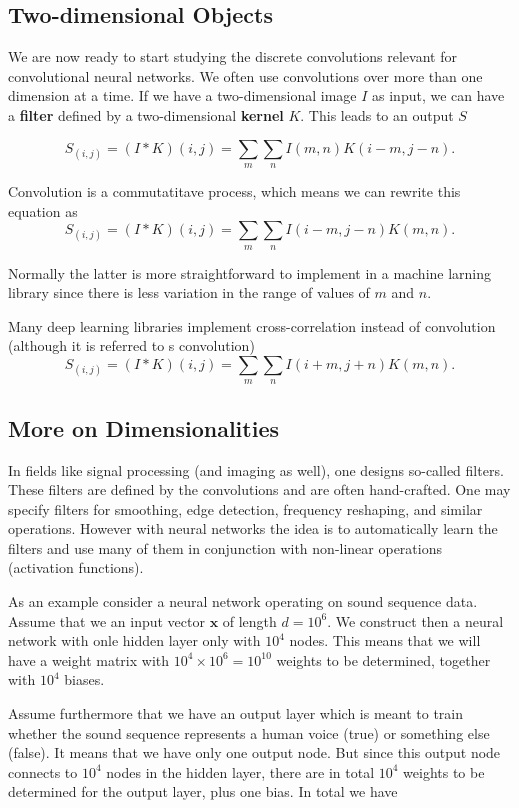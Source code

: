 \documentclass[%
oneside,                 %
final,                   %
10pt]{article}
\begin{document}
\subsection{Two-dimensional Objects}

We are now ready to start studying the discrete convolutions relevant for convolutional neural networks.
We often use convolutions over more than one dimension at a time. If
we have a two-dimensional image $I$ as input, we can have a \textbf{filter}
defined by a two-dimensional \textbf{kernel} $K$. This leads to an output $S$

\[
S_(i,j)=(I * K)(i,j) = \sum_m\sum_n I(m,n)K(i-m,j-n).
\]

Convolution is a commutatitave process, which means we can rewrite this equation as
\[
S_(i,j)=(I * K)(i,j) = \sum_m\sum_n I(i-m,j-n)K(m,n).
\]

Normally the latter is more straightforward to implement in  a machine larning library since there is less variation in the range of values of $m$ and $n$.

Many deep learning libraries implement cross-correlation instead of convolution (although it is referred to s convolution)
\[
S_(i,j)=(I * K)(i,j) = \sum_m\sum_n I(i+m,j+n)K(m,n).
\]

\subsection{More on Dimensionalities}

In fields like signal processing (and imaging as well), one designs
so-called filters. These filters are defined by the convolutions and
are often hand-crafted. One may specify filters for smoothing, edge
detection, frequency reshaping, and similar operations. However with
neural networks the idea is to automatically learn the filters and use
many of them in conjunction with non-linear operations (activation
functions).

As an example consider a neural network operating on sound sequence
data.  Assume that we an input vector $\bm{x}$ of length $d=10^6$.  We
construct then a neural network with onle hidden layer only with
$10^4$ nodes. This means that we will have a weight matrix with
$10^4\times 10^6=10^{10}$ weights to be determined, together with $10^4$ biases.

Assume furthermore that we have an output layer which is meant to train whether the sound sequence represents a human voice (true) or something else (false).
It means that we have only one output node. But since this output node connects to $10^4$ nodes in the hidden layer, there are in total $10^4$ weights to be determined for the output layer, plus one bias. In total we have
\end{document}
